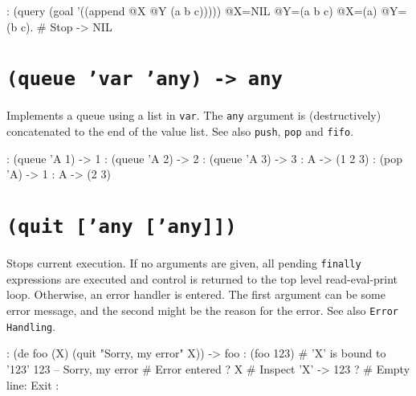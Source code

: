 \begin{wideverbatim}
: (query (goal '((append @X @Y (a b c)))))
 @X=NIL @Y=(a b c)
 @X=(a) @Y=(b c).   # Stop
-> NIL
\end{wideverbatim}

 
\section*{\texttt{(queue 'var 'any) -> any}}
\label{sec:func-ref-Q-(queue 'var 'any) -> any}


Implements a queue using a list in \texttt{var}. The \texttt{any} argument is
(destructively) concatenated to the end of the value list. See also
\texttt{push}, \texttt{pop} and \texttt{fifo}.


\begin{wideverbatim}
: (queue 'A 1)
-> 1
: (queue 'A 2)
-> 2
: (queue 'A 3)
-> 3
: A
-> (1 2 3)
: (pop 'A)
-> 1
: A
-> (2 3)
\end{wideverbatim}

 
\section*{\texttt{(quit ['any ['any]])}}
\label{sec:func-ref-Q-(quit ['any ['any]])}


Stops current execution. If no arguments are given, all pending
\texttt{finally} expressions are executed and control is returned to the top
level read-eval-print loop. Otherwise, an error handler is entered. The
first argument can be some error message, and the second might be the
reason for the error. See also \texttt{Error Handling}.


\begin{wideverbatim}
: (de foo (X) (quit "Sorry, my error" X))
-> foo
: (foo 123)                                  # 'X' is bound to '123'
123 -- Sorry, my error                       # Error entered
? X                                          # Inspect 'X'
-> 123
?                                            # Empty line: Exit
:
\end{wideverbatim}


